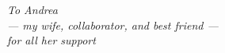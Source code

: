 
\thispagestyle{empty}
\vspace*{3.5cm}
\begin{center}\LARGE\sl
  To Andrea\\
  --- my wife, collaborator, and best friend ---\\
  for all her support
\end{center}


